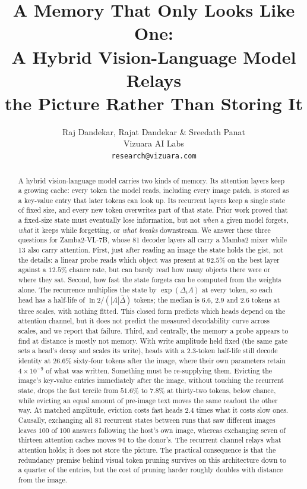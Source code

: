 \documentclass{article}
\title{A Memory That Only Looks Like One:\\
A Hybrid Vision-Language Model Relays\\
the Picture Rather Than Storing It}
\author{Raj Dandekar, Rajat Dandekar \& Sreedath Panat\\
Vizuara AI Labs\\
\texttt{research@vizuara.com}}
\begin{document}
\maketitle

\begin{abstract}
A hybrid vision-language model carries two kinds of memory. Its attention
layers keep a growing cache: every token the model reads, including every
image patch, is stored as a key-value entry that later tokens can look up. Its
recurrent layers keep a single state of fixed size, and every new token
overwrites part of that state. Prior work proved that a fixed-size state must
eventually lose information, but not \emph{when} a given model forgets,
\emph{what} it keeps while forgetting, or \emph{what breaks} downstream. We
answer these three questions for Zamba2-VL-7B, whose 81 decoder
layers all carry a Mamba2 mixer while 13 also carry attention. First, just
after reading an image the state holds the gist, not the details: a linear
probe reads which object was present at $92.5\%$ on the best layer against a
$12.5\%$ chance rate, but can barely read how many objects there were or where
they sat. Second, how fast the state forgets can be computed from the weights
alone. The recurrence multiplies the state by $\exp(\Delta_t A)$ at every
token, so each head has a half-life of $\ln 2/(|A|\bar{\Delta})$ tokens; the
median is $6.6$, $2.9$ and $2.6$ tokens at three scales, with nothing fitted.
This closed form predicts which heads depend on the attention channel, but it
does not predict the measured decodability curve across scales, and we report
that failure. Third, and centrally, the memory a probe appears to find at
distance is mostly not memory. With write amplitude held fixed (the same gate
sets a head's decay and scales its write), heads with a $2.3$-token half-life
still decode identity at $26.6\%$ sixty-four tokens after the image, where
their own parameters retain $4\times10^{-9}$ of what was written. Something
must be re-supplying them. Evicting the image's key-value entries immediately
after the image, without touching the recurrent state, drops the fast tercile
from $51.6\%$ to $7.8\%$ at thirty-two tokens, below chance, while evicting an
equal amount of pre-image text moves the same readout the other way. At
matched amplitude, eviction costs fast heads $2.4$ times what it costs slow
ones. Causally, exchanging all 81 recurrent states between runs that saw
different images leaves $100$ of $100$ answers following the host's own image,
whereas exchanging seven of thirteen attention caches moves $94$ to the
donor's. The recurrent channel relays what attention holds; it does not store
the picture. The practical consequence is that the redundancy premise behind
visual token pruning survives on this architecture down to a quarter of the
entries, but the cost of pruning harder roughly doubles with distance from the
image.
\end{abstract}
\end{document}
